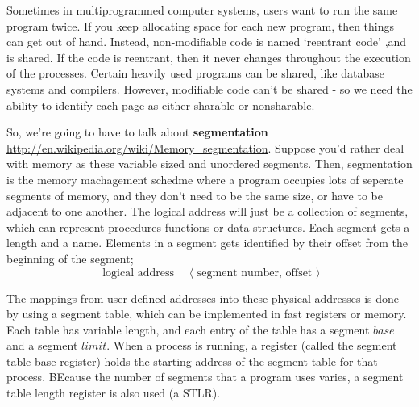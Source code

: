 \documentclass{article}
\begin{document}
Sometimes in multiprogrammed computer systems, users want to run the same program twice. If you keep allocating space for each new program, then things can get out of hand. Instead, non-modifiable code is named `reentrant code' ,and is shared. If the code is reentrant, then it never changes throughout the execution of the processes. Certain heavily used programs can be shared, like database systems and compilers. However, modifiable code can't be shared - so we need the ability to identify each page as either sharable or nonsharable. 

So, we're going to have to talk about {\bf segmentation} \url{http://en.wikipedia.org/wiki/Memory_segmentation}. Suppose you'd rather deal with memory as these variable sized and unordered segments. Then, segmentation is the memory machagement schedme where a program occupies lots of seperate segments of memory, and they don't need to be the same size, or have to be adjacent to one another. The logical address will just be a collection of segments, which can represent procedures functions or data structures. Each segment gets a length and a name. Elements in a segment gets identified by their offset from the beginning of the segment; 
\[
\text{ logical address } \quad \langle \text{ segment number, offset }\rangle
\]

The mappings from user-defined addresses into these physical addresses is done by using a segment table, which can be implemented in fast registers or memory. Each table has variable length, and each entry of the table has a segment $base$ and a segment $limit$. When a process is running, a register (called the segment table base register) holds the starting address of the segment table for that process. BEcause the number of segments that a program uses varies, a segment table length register is also used (a STLR). 
\end{document}
